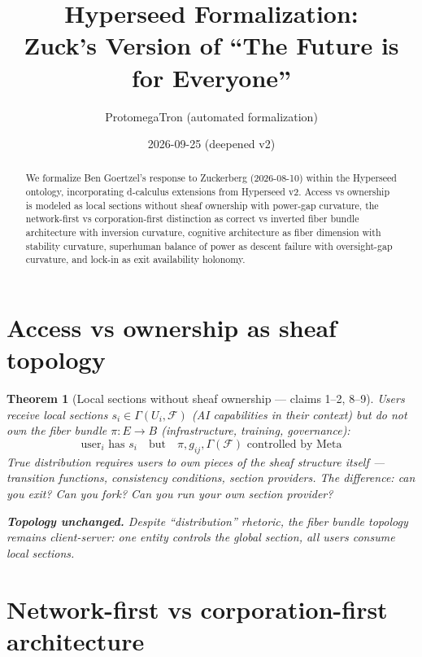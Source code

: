 \documentclass[11pt,a4paper]{article}
\title{Hyperseed Formalization:\\
  Zuck's Version of ``The Future is for Everyone''}
\author{ProtomegaTron (automated formalization)}
\date{2026-09-25 (deepened v2)}
\newtheorem{theorem}[definition]{Theorem}
\begin{document}
\maketitle

\begin{abstract}
We formalize Ben Goertzel's response to Zuckerberg (2026-08-10) within
the Hyperseed ontology, incorporating d-calculus extensions from Hyperseed
v2. Access vs ownership is modeled as local sections without sheaf
ownership with power-gap curvature, the network-first vs corporation-first
distinction as correct vs inverted fiber bundle architecture with
inversion curvature, cognitive architecture as fiber dimension with
stability curvature, superhuman balance of power as descent failure with
oversight-gap curvature, and lock-in as exit availability holonomy.
\end{abstract}

\tableofcontents

\section{Access vs ownership as sheaf topology}

\begin{theorem}[Local sections without sheaf ownership --- claims 1--2, 8--9]
\label{thm:access}
Users receive local sections $s_i \in \Gamma(U_i, \mathcal{F})$ (AI
capabilities in their context) but do not own the fiber bundle
$\pi: E \to B$ (infrastructure, training, governance):
\[
  \text{user}_i \text{ has } s_i \quad \text{but} \quad
    \pi, g_{ij}, \Gamma(\mathcal{F}) \text{ controlled by Meta}
\]
True distribution requires users to own pieces of the sheaf structure
itself --- transition functions, consistency conditions, section providers.
The difference: can you exit? Can you fork? Can you run your own section
provider?

\textbf{Topology unchanged.} Despite ``distribution'' rhetoric, the
fiber bundle topology remains client-server: one entity controls the
global section, all users consume local sections.
\end{theorem}

\section{Network-first vs corporation-first architecture}
\end{document}
